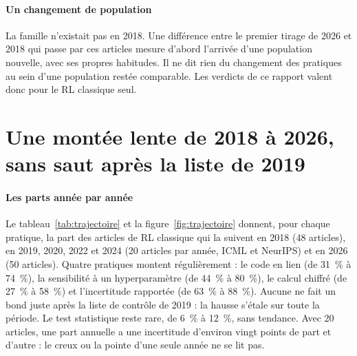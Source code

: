 
\paragraph{Un changement de population}
La famille  n'existait pas en 2018. Une différence entre le premier tirage de 2026 et 2018 qui
passe par ces articles mesure d'abord l'arrivée d'une population nouvelle, avec ses propres habitudes.
Il ne dit rien du changement des pratiques au sein d'une population restée comparable. Les verdicts de
ce rapport valent donc pour le RL classique seul.

\section{Une montée lente de 2018 à 2026, sans saut après la liste de 2019}\label{sec:sr-trajectoire}

\paragraph{Les parts année par année}
Le tableau~\ref{tab:trajectoire} et la figure~\ref{fig:trajectoire} donnent, pour chaque pratique, la part des
articles de RL classique qui la suivent en 2018 (48 articles), en 2019, 2020, 2022 et 2024 (20 articles
par année, ICML et NeurIPS) et en 2026 (50 articles). Quatre pratiques montent régulièrement : le code
en lien (de 31~\% à 74~\%), la sensibilité à un hyperparamètre (de 44~\% à 80~\%), le calcul chiffré (de
27~\% à 58~\%) et l'incertitude rapportée (de 63~\% à 88~\%). Aucune ne fait un bond juste après la liste
de contrôle de 2019 : la hausse s'étale sur toute la période. Le test statistique reste rare, de 6~\% à
12~\%, sans tendance. Avec 20 articles, une part annuelle a une incertitude d'environ vingt points de part
et d'autre : le creux ou la pointe d'une seule année ne se lit pas.




